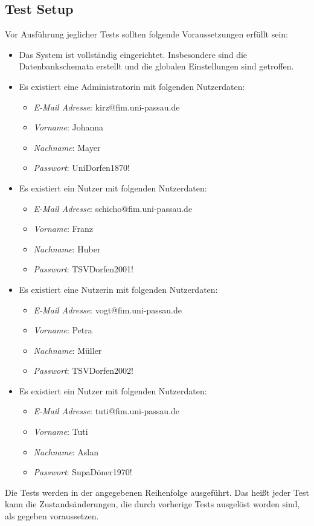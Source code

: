 \subsection{Test Setup}
Vor Ausführung jeglicher Tests sollten folgende Voraussetzungen erfüllt sein:
\begin{itemize}
	\item Das System ist vollständig eingerichtet.
	Insbesondere sind die Datenbankschemata erstellt und die globalen Einstellungen sind getroffen.
	\item Es existiert eine Administratorin mit folgenden Nutzerdaten:
	\begin{itemize}
		\item \emph{E-Mail Adresse}: kirz@fim.uni-passau.de
		\item \emph{Vorname}: Johanna
		\item \emph{Nachname}: Mayer
		\item \emph{Passwort}: UniDorfen1870!
	\end{itemize}
	\item Es existiert ein Nutzer mit folgenden Nutzerdaten:
	\begin{itemize}
		\item \emph{E-Mail Adresse}: schicho@fim.uni-passau.de
		\item \emph{Vorname}: Franz
		\item \emph{Nachname}: Huber
		\item \emph{Passwort}: TSVDorfen2001!
	\end{itemize}
	\item Es existiert eine Nutzerin mit folgenden Nutzerdaten:
	\begin{itemize}
		\item \emph{E-Mail Adresse}: vogt@fim.uni-passau.de
		\item \emph{Vorname}: Petra
		\item \emph{Nachname}: Müller
		\item \emph{Passwort}: TSVDorfen2002!
	\end{itemize}
	\item Es existiert ein Nutzer mit folgenden Nutzerdaten:
	\begin{itemize}
		\item \emph{E-Mail Adresse}: tuti@fim.uni-passau.de
		\item \emph{Vorname}: Tuti
		\item \emph{Nachname}: Aslan
		\item \emph{Passwort}: SupaDöner1970!
	\end{itemize}
\end{itemize}
Die Tests werden in der angegebenen Reihenfolge ausgeführt.
Das heißt jeder Test kann die Zustandsänderungen, die durch vorherige Tests ausgelöst worden sind, als gegeben voraussetzen.
